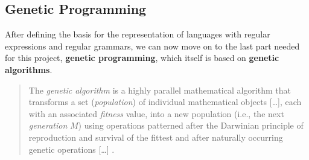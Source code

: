 \documentclass[runningheads]{llncs}
\begin{document}
\subsection{Genetic Programming}
After defining the basis for the representation of languages with regular expressions and regular grammars, we can now move on to the last part needed for this project, \textbf{genetic programming}, which itself is based on \textbf{genetic algorithms}.
\begin{quote}
The \emph{genetic algorithm} is a highly parallel mathematical algorithm that transforms a set (\emph{population}) of individual mathematical objects [\ldots{}], each with an associated \emph{fitness} value, into a new population (i.e., the next \emph{generation} $M$) using operations patterned after the Darwinian principle of reproduction and survival of the fittest and after naturally occurring genetic operations [\ldots{}] \cite[18]{gp1-1993}.
\end{quote}
\end{document}
